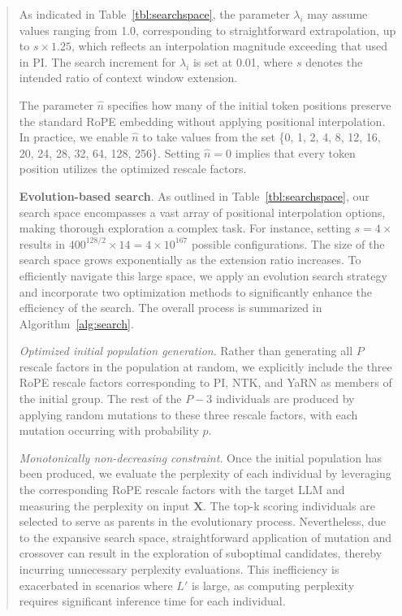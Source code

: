 \begin{abstract}
As indicated in Table~\ref{tbl:searchspace}, the parameter $\lambda_i$ may assume values ranging from 1.0, corresponding to straightforward extrapolation, up to $s\times1.25$, which reflects an interpolation magnitude exceeding that used in PI. The search increment for $\lambda_i$ is set at 0.01, where $s$ denotes the intended ratio of context window extension.

The parameter $\hat{n}$ specifies how many of the initial token positions preserve the standard RoPE embedding without applying positional interpolation. In practice, we enable $\hat{n}$ to take values from the set \{0, 1, 2, 4, 8, 12, 16, 20, 24, 28, 32, 64, 128, 256\}. Setting $\hat{n}=0$ implies that every token position utilizes the optimized rescale factors.

\textbf{Evolution-based search}. As outlined in Table~\ref{tbl:searchspace}, our search space encompasses a vast array of positional interpolation options, making thorough exploration a complex task. For instance, setting $s=4\times$ results in $400^{128/2}\times14=4\times10^{167}$ possible configurations. The size of the search space grows exponentially as the extension ratio increases. To efficiently navigate this large space, we apply an evolution search strategy~\cite{guo2020single} and incorporate two optimization methods to significantly enhance the efficiency of the search. The overall process is summarized in Algorithm~\ref{alg:search}.

\textit{Optimized initial population generation}. Rather than generating all $P$ rescale factors in the population at random, we explicitly include the three RoPE rescale factors corresponding to PI, NTK, and YaRN as members of the initial group. The rest of the $P-3$ individuals are produced by applying random mutations to these three rescale factors, with each mutation occurring with probability $p$.

\textit{Monotonically non-decreasing constraint}. Once the initial population has been produced, we evaluate the perplexity of each individual by leveraging the corresponding RoPE rescale factors with the target LLM and measuring the perplexity on input $\mathbf{X}$. The top-k scoring individuals are selected to serve as parents in the evolutionary process. Nevertheless, due to the expansive search space, straightforward application of mutation and crossover can result in the exploration of suboptimal candidates, thereby incurring unnecessary perplexity evaluations. This inefficiency is exacerbated in scenarios where $L'$ is large, as computing perplexity requires significant inference time for each individual.


\end{abstract}
